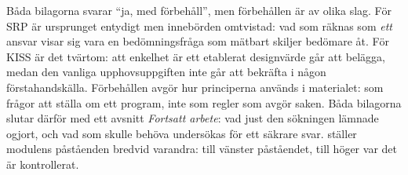 Båda bilagorna svarar \enquote{ja, med förbehåll}, men förbehållen är
av olika slag.  För SRP är ursprunget entydigt men innebörden omtvistad:
vad som räknas som \emph{ett} ansvar visar sig vara en bedömningsfråga
som mätbart skiljer bedömare åt.  För KISS är det tvärtom: att enkelhet
är ett etablerat designvärde går att belägga, medan den vanliga
upphovsuppgiften inte går att bekräfta i någon förstahandskälla.
Förbehållen avgör hur principerna används i materialet: som frågor att
ställa om ett program, inte som regler som avgör saken.  Båda bilagorna
slutar därför med ett avsnitt \emph{Fortsatt arbete}: vad just den
sökningen lämnade ogjort, och vad som skulle behöva undersökas för ett
säkrare svar.   ställer modulens påståenden
bredvid varandra: till vänster påståendet, till höger var det är
kontrollerat.

